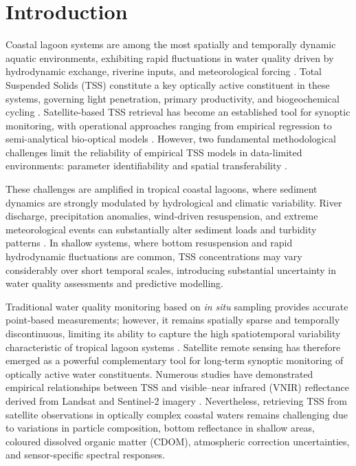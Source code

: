 \documentclass[remotesensing,article,submit,pdftex,moreauthors]{Definitions/mdpi}
\begin{document}
\section{Introduction}

Coastal lagoon systems are among the most spatially and temporally
dynamic aquatic environments, exhibiting rapid fluctuations in water
quality driven by hydrodynamic exchange, riverine inputs, and
meteorological forcing \citep{Barbier2011, Barbier2017}.
Total Suspended Solids (TSS) constitute a key optically active
constituent in these systems, governing light penetration, primary
productivity, and biogeochemical cycling \citep{Arias2022}.
Satellite-based TSS retrieval has become an established tool for
synoptic monitoring, with operational approaches ranging from empirical
regression to semi-analytical bio-optical models \citep{Pahlevan2022, adjovu}.
However, two fundamental methodological challenges limit the reliability
of empirical TSS models in data-limited environments: parameter
identifiability and spatial transferability \citep{Arias2022, Hua2017}.
 
These challenges are amplified in tropical coastal lagoons, where
sediment dynamics are strongly modulated by hydrological and climatic
variability. River discharge, precipitation anomalies, wind-driven
resuspension, and extreme meteorological events can substantially alter
sediment loads and turbidity patterns \citep{Yunus2021, Li2021}. In
shallow systems, where bottom resuspension and rapid hydrodynamic
fluctuations are common, TSS concentrations may vary considerably over
short temporal scales, introducing substantial uncertainty in water
quality assessments and predictive modelling.
 
Traditional water quality monitoring based on \textit{in situ} sampling
provides accurate point-based measurements; however, it remains
spatially sparse and temporally discontinuous, limiting its ability to
capture the high spatiotemporal variability characteristic of tropical
lagoon systems \citep{Arias2022}. Satellite remote sensing has therefore
emerged as a powerful complementary tool for long-term synoptic
monitoring of optically active water constituents. Numerous studies have
demonstrated empirical relationships between TSS and visible--near
infrared (VNIR) reflectance derived from Landsat and Sentinel-2 imagery
\citep{adjovu,Li2021}.
Nevertheless, retrieving TSS from satellite observations in optically
complex coastal waters remains challenging due to variations in particle
composition, bottom reflectance in shallow areas, coloured dissolved
organic matter (CDOM), atmospheric correction uncertainties, and
sensor-specific spectral responses.
 
\end{document}
